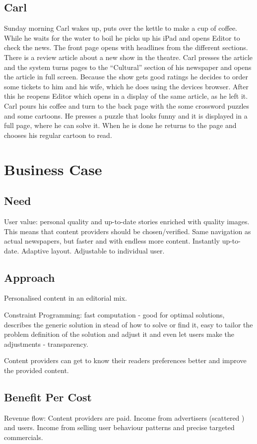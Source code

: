 \subsection{Carl}
Sunday morning Carl wakes up, puts over the kettle to make a cup of coffee. While he waits for the water to boil he picks up his iPad and opens Editor to check the news. The front page opens with headlines from the different sections. There is a review article about a new show in the theatre. Carl presses the article and the system turns pages to the ``Cultural'' section of his newspaper and opens the article in full screen. Because the show gets good ratings he decides to order some tickets to him and his wife, which he does using the devices browser. After this he reopens Editor which opens in a display of the same article, as he left it. Carl pours his coffee and turn to the back page with the some crossword puzzles and some cartoons. He presses a puzzle that looks funny and it is displayed in a full page, where he can solve it. When he is done he returns to the page and chooses his regular cartoon to read.

\section{Business Case}
\subsection{Need}
User value: personal quality and up-to-date stories enriched with quality images. This means that content providers should be chosen/verified. Same navigation as actual newspapers, but faster and with endless more content. Instantly up-to-date. Adaptive layout. Adjustable to individual user.

\subsection{Approach}
Personalised content in an editorial mix.

Constraint Programming: fast computation - good for optimal solutions, describes the generic solution in stead of how to solve or find it, easy to tailor the problem definition of the solution and adjust it and even let users make the adjustments - transparency.

Content providers can get to know their readers preferences better and improve the provided content.

\subsection{Benefit Per Cost}
Revenue flow: Content providers are paid. Income from advertisers (scattered \cite[p. 6-7]{kristin_fredrik.pdf}) and users. Income from selling user behaviour patterns and precise targeted commercials.

